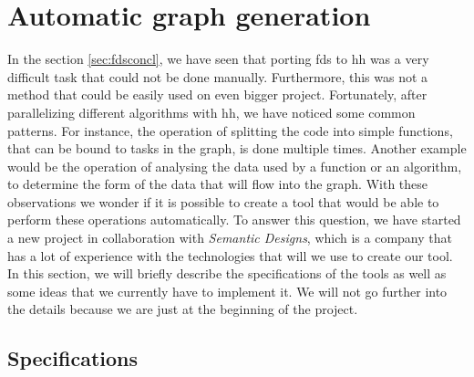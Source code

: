 
\clearpage{}
\section{Automatic graph generation}

In the section \ref{sec:fdsconcl}, we have seen that porting \gls{fds} to
\gls{hh} was a very difficult task that could not be done manually. Furthermore,
this was not a method that could be easily used on even bigger project.
Fortunately, after parallelizing different algorithms with \gls{hh}, we have
noticed some common patterns. For instance, the operation of splitting the code
into simple functions, that can be bound to tasks in the graph, is done multiple
times. Another example would be the operation of analysing the data used by a
function or an algorithm, to determine the form of the data that will flow into
the graph. With these observations we wonder if it is possible to create a tool
that would be able to perform these operations automatically. To answer this
question, we have started a new project in collaboration with \textit{Semantic
Designs}, which is a company that has a lot of experience with the technologies
that will we use to create our tool. In this section, we will briefly describe
the specifications of the tools as well as some ideas that we currently have to
implement it. We will not go further into the details because we are just at the
beginning of the project.

\subsection{Specifications}

